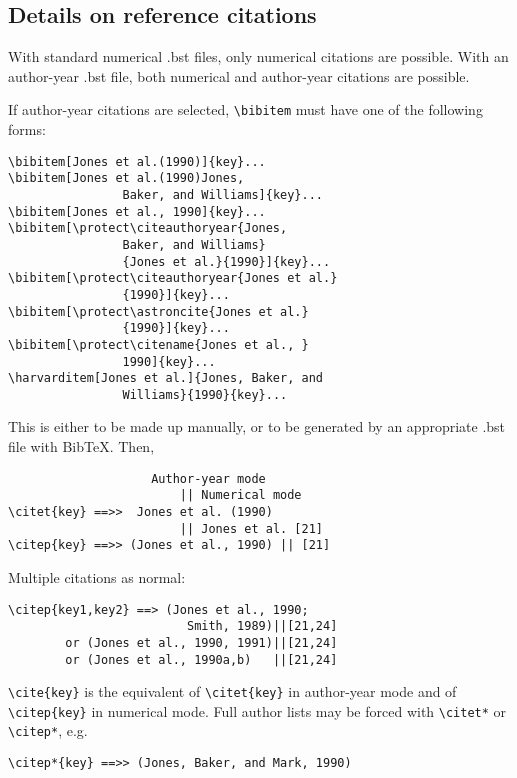 \documentclass[unnumsec,webpdf,contemporary,large]{oup-authoring-template}%
\theoremstyle{thmstyleone}%
\theoremstyle{thmstyletwo}%
\theoremstyle{thmstylethree}%
\begin{document}
\subsection{Details on reference citations}\label{subsec3}

With standard numerical .bst files, only numerical citations are possible.
With an author-year .bst file, both numerical and author-year citations are possible.

If author-year citations are selected, \verb+\bibitem+ must have one of the following forms:


{\footnotesize%
\begin{verbatim}
\bibitem[Jones et al.(1990)]{key}...
\bibitem[Jones et al.(1990)Jones,
                Baker, and Williams]{key}...
\bibitem[Jones et al., 1990]{key}...
\bibitem[\protect\citeauthoryear{Jones,
                Baker, and Williams}
                {Jones et al.}{1990}]{key}...
\bibitem[\protect\citeauthoryear{Jones et al.}
                {1990}]{key}...
\bibitem[\protect\astroncite{Jones et al.}
                {1990}]{key}...
\bibitem[\protect\citename{Jones et al., }
                1990]{key}...
\harvarditem[Jones et al.]{Jones, Baker, and
                Williams}{1990}{key}...
\end{verbatim}}


This is either to be made up manually, or to be generated by an
appropriate .bst file with BibTeX. Then,


{%
		\begin{verbatim}
                    Author-year mode
                        || Numerical mode
\citet{key} ==>>  Jones et al. (1990)
                        || Jones et al. [21]
\citep{key} ==>> (Jones et al., 1990) || [21]
\end{verbatim}}


\noindent
Multiple citations as normal:


{%
\begin{verbatim}
\citep{key1,key2} ==> (Jones et al., 1990;
                         Smith, 1989)||[21,24]
        or (Jones et al., 1990, 1991)||[21,24]
        or (Jones et al., 1990a,b)   ||[21,24]
\end{verbatim}}


\noindent
\verb+\cite{key}+ is the equivalent of \verb+\citet{key}+ in author-year mode
and  of \verb+\citep{key}+ in numerical mode. Full author lists may be forced with
\verb+\citet*+ or \verb+\citep*+, e.g.


	{%
		\begin{verbatim}
\citep*{key} ==>> (Jones, Baker, and Mark, 1990)
\end{verbatim}}
\end{document}
